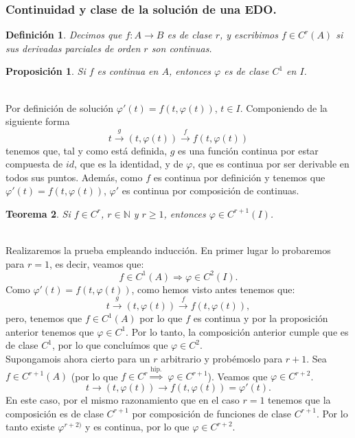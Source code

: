 \documentclass{article}
\makeatletter
\theoremstyle{theorem-style}  %
\newtheorem{theorem}{Teorema}[section]  %
\newtheorem{proposition}[theorem]{Proposición}
\theoremstyle{definition-style}
\newtheorem{definition}{Definición}[section]
\theoremstyle{example-style}
\renewenvironment{proof}[1][\proofname]{\par
	\pushQED{\qed}%
	\normalfont \topsep6\p@\@plus6\p@\relax
	\list{}{%
		\settowidth{\leftmargin}{\quad:\hskip\labelsep}%
		\setlength{\labelwidth}{0pt}%
		\setlength{\itemindent}{-\leftmargin}%
	}%
	\item[\hskip\labelsep\itshape#1\@addpunct{:}]\ignorespaces
}{%
	\popQED\endlist\@endpefalse
}
\makeatother
\begin{document}
\subsubsection{Continuidad y clase de la solución de una EDO.}
\begin{definition}
	Decimos que $ f:A\longrightarrow B $ es de clase $ r $, y escribimos $ f\in C^r(A) $ si sus derivadas parciales de orden $ r $ son continuas.
\end{definition}
\begin{proposition}
	Si $f$ es continua en $A$, entonces $\varphi$ es de clase $C^1$ en $I$.
\end{proposition}
\begin{proof} \ \\
	Por definición de solución $\varphi' (t) = f(t, \varphi (t))$, $t \in I$. Componiendo de la siguiente forma
	\[t \stackrel{g}{\longrightarrow} (t, \varphi (t)) \stackrel{f}{\longrightarrow} f(t, \varphi (t))\]
	tenemos que, tal y como está definida, $g$ es una función continua por estar compuesta de $id$, que es la identidad, y de $\varphi$, que es continua por ser derivable en todos sus puntos. Además, como $f$ es continua por definición y tenemos que $\varphi' (t) = f(t, \varphi (t))$, $\varphi'$ es continua por composición de continuas.
\end{proof}
\begin{theorem}
	Si $f \in C^r$, $r \in \mathbb{N}$ y $r \geq 1$, entonces $\varphi \in C^{r+1}(I)$.
\end{theorem}
\begin{proof}\ \\
	Realizaremos la prueba empleando inducción. En primer lugar lo probaremos para $r=1$, es decir, veamos que:
	\[f\in C^1(A) \Rightarrow \varphi \in C^2(I).\]
	Como $\varphi' (t) = f(t, \varphi (t))$, como hemos visto antes tenemos que:
		\[t \stackrel{g}{\longrightarrow} (t, \varphi (t)) \stackrel{f}{\longrightarrow} f(t, \varphi (t)),\]
	pero, tenemos que $f \in C^1(A)$ por lo que $f$ es continua y por la proposición anterior tenemos que $\varphi \in C^1$. Por lo tanto, la composición anterior cumple que es de clase $C^1$, por lo que concluímos que $\varphi \in C^2$. \\
	Supongamois ahora cierto para un $r$ arbitrario y probémoslo para $r+1$. Sea $f \in C^{r+1} (A)$ (por lo que $f \in C^r \stackrel{\text{hip.}}{\Rightarrow}$ $\varphi \in C^{r+1}$). Veamos que $\varphi \in C^{r+2}$.
	\[t \longrightarrow (t, \varphi (t)) \longrightarrow f(t, \varphi (t)) = \varphi' (t).\]
	En este caso, por el mismo razonamiento que en el caso $r=1$ tenemos que la composición es de clase $C^{r+1}$ por composición de funciones de clase $C^{r+1}$. Por lo tanto existe $\varphi^{r+2)}$ y es continua, por lo que $\varphi \in C^{r+2}$. 
\end{proof}
\end{document}
